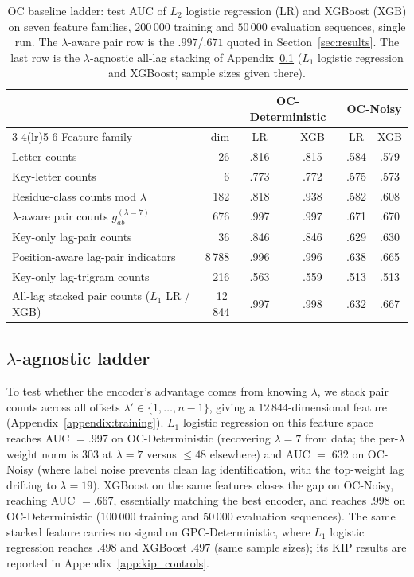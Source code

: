 \documentclass{article} %
\theoremstyle{plain}
\theoremstyle{definition}
\theoremstyle{remark}
\begin{document}
\begin{table}[h]
\centering\small
\caption{OC baseline ladder: test AUC of $L_2$ logistic regression (LR) and XGBoost (XGB) on seven feature families, $200\,000$ training and $50\,000$ evaluation sequences, single run. The $\lambda$-aware pair row is the $.997$/$.671$ quoted in Section~\ref{sec:results}. The last row is the $\lambda$-agnostic all-lag stacking of Appendix~\ref{appendix:lam_agnostic} ($L_1$ logistic regression and XGBoost; sample sizes given there).}
\label{tab:ladder}
\begin{tabular}{@{}lrcccc@{}}
\toprule
 & & \multicolumn{2}{c}{OC-Deterministic} & \multicolumn{2}{c}{OC-Noisy} \\
\cmidrule(lr){3-4}\cmidrule(lr){5-6}
Feature family & dim & LR & XGB & LR & XGB \\
\midrule
Letter counts & 26 & .816 & .815 & .584 & .579 \\
Key-letter counts & 6 & .773 & .772 & .575 & .573 \\
Residue-class counts mod $\lambda$ & 182 & .818 & .938 & .582 & .608 \\
$\lambda$-aware pair counts $g_{ab}^{(\lambda=7)}$ & 676 & .997 & .997 & .671 & .670 \\
Key-only lag-pair counts & 36 & .846 & .846 & .629 & .630 \\
Position-aware lag-pair indicators & 8\,788 & .996 & .996 & .638 & .665 \\
Key-only lag-trigram counts & 216 & .563 & .559 & .513 & .513 \\
\midrule
All-lag stacked pair counts ($L_1$ LR / XGB) & 12\,844 & .997 & .998 & .632 & .667 \\
\bottomrule
\end{tabular}
\end{table}

\subsection{$\lambda$-agnostic ladder}
\label{appendix:lam_agnostic}
To test whether the encoder's advantage comes from knowing $\lambda$, we stack pair counts across all offsets $\lambda' \in \{1, \ldots, n{-}1\}$, giving a $12\,844$-dimensional feature (Appendix~\ref{appendix:training}). $L_1$ logistic regression on this feature space reaches AUC $=.997$ on OC-Deterministic (recovering $\lambda=7$ from data; the per-$\lambda$ weight norm is $303$ at $\lambda=7$ versus $\le 48$ elsewhere) and AUC $=.632$ on OC-Noisy (where label noise prevents clean lag identification, with the top-weight lag drifting to $\lambda=19$). XGBoost on the same features closes the gap on OC-Noisy, reaching AUC $=.667$, essentially matching the best encoder, and reaches $.998$ on OC-Deterministic ($100\,000$ training and $50\,000$ evaluation sequences). The same stacked feature carries no signal on GPC-Deterministic, where $L_1$ logistic regression reaches $.498$ and XGBoost $.497$ (same sample sizes); its KIP results are reported in Appendix~\ref{app:kip_controls}.
\end{document}
